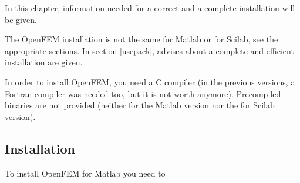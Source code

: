 


In this chapter, information needed for a correct and a complete installation will be given.

The OpenFEM installation is not the same for Matlab or for Scilab, see the appropriate sections. In section \ref{usepack}, advises about a complete and efficient installation are given.

In order to install OpenFEM, you need a C compiler (in the previous versions, a Fortran compiler was needed too, but it is not worth anymore). Precompiled binaries are not provided (neither for the Matlab version nor the for Scilab version).




\subsection{Installation}

To install OpenFEM for Matlab you need to 

